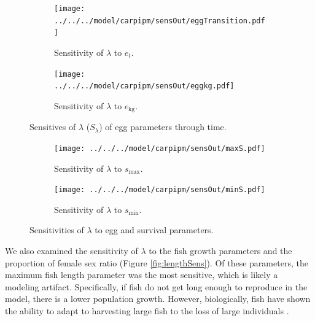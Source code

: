 \documentclass{article}[12pt]
\begin{document}
\begin{figure}[htbp]
	\centering
	\begin{subfigure}[b]{0.45\textwidth}
	   \texttt{[image: ../../../model/carpipm/sensOut/eggTransition.pdf]} %
	   \caption{Sensitivity of \(\lambda\) to \(e_t\).}
	   \label{fig:sensET}
	\end{subfigure}
	\begin{subfigure}[b]{0.45\textwidth}
	   \texttt{[image: ../../../model/carpipm/sensOut/eggkg.pdf]} %
	   \caption{Sensitivity of \(\lambda\) to \(e_\text{kg}\).}
	   \label{fig:sensEKG}
	\end{subfigure}
   \caption{Sensitives of \(\lambda\) (\(S_\lambda\)) of egg parameters through time.}
   	\begin{subfigure}[b]{0.45\textwidth}
	   \texttt{[image: ../../../model/carpipm/sensOut/maxS.pdf]} %
	   \caption{Sensitivity of \(\lambda\) to \(s_\text{max}\).}
	   \label{fig:sensSmax}
	\end{subfigure}
	\begin{subfigure}[b]{0.45\textwidth}
	   \texttt{[image: ../../../model/carpipm/sensOut/minS.pdf]} %
	   \caption{Sensitivity of \(\lambda\) to \(s_\text{min}\).}
	   \label{fig:sensSmin}
	\end{subfigure}  
   \caption{Sensitivities of \(\lambda\) to egg and survival parameters.}
   \label{fig:eggSens}  
\end{figure}

We also examined the sensitivity of \(\lambda\) to the fish growth parameters and the proportion of female sex ratio (Figure \ref{fig:lengthSens}). 
Of these parameters, the maximum fish length parameter was the most sensitive, which is likely a modeling artifact.
Specifically, if fish do not get long enough to reproduce in the model, there is a lower population growth.
However, biologically, fish have shown the ability to adapt to harvesting large fish to the loss of large individuals \citep[e.g., harvesting large fish;][]{birkeland2005importance}.
\end{document}
